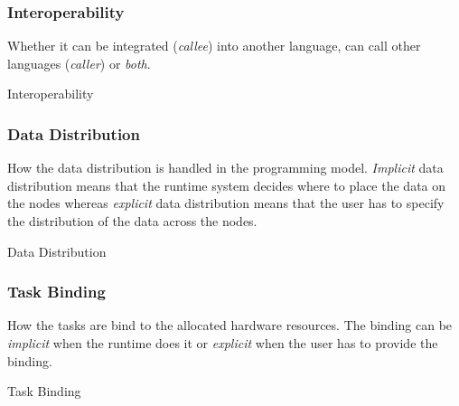 \subsubsection{Interoperability}
Whether it can be integrated (\textit{callee}) into another language, can call other languages (\textit{caller}) or \textit{both}.
\begin{table}[H]
	\caption{Interoperability}
	\centering
	\begin{multicols}{2}
		

		
	\end{multicols}
\end{table}

\subsubsection{Data Distribution}
How the data distribution is handled in the programming model.
\textit{Implicit} data distribution means that the runtime system decides where to place the data on the nodes whereas \textit{explicit} data distribution means that the user has to specify the distribution of the data across the nodes.
\begin{table}[H]
	\caption{Data Distribution}
	\centering
	\begin{multicols}{2}
		

		
	\end{multicols}
\end{table}

\subsubsection{Task Binding}
How the tasks are bind to the allocated hardware resources.
The binding can be \textit{implicit} when the runtime does it or \textit{explicit} when the user has to provide the binding.
\begin{table}[H]
	\caption{Task Binding}
	\centering
	\begin{multicols}{2}
		

		
	\end{multicols}
\end{table}

